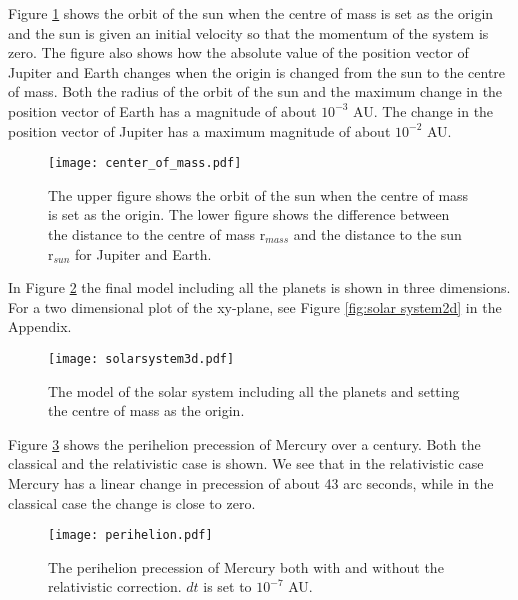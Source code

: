 Figure \ref{fig:centre of mass} shows the orbit of the sun when the centre of mass is set as the origin and the sun is given an initial velocity so that the momentum of the system is zero. The figure also shows how the absolute value of the position vector of Jupiter and Earth changes when the origin is changed from the sun to the centre of mass. Both the radius of the orbit of the sun and the maximum change in the position vector of Earth has a magnitude of about $10^{-3}$ AU. The change in the position vector of Jupiter has a maximum magnitude of about $10^{-2}$ AU.
\begin{figure}[htbp]
	\centering
	\texttt{[image: center\_of\_mass.pdf]}
	\caption{The upper figure shows the orbit of the sun when the centre of mass is set as the origin. The lower figure shows the difference between the distance to the centre of mass r$_{mass}$ and the distance to the sun r$_{sun}$ for Jupiter and Earth.}
	\label{fig:centre of mass}
\end{figure}

In Figure \ref{fig:solar system} the final model including all the planets is shown in three dimensions. For a two dimensional plot of the xy-plane, see Figure \ref{fig:solar system2d} in the Appendix.
\begin{figure}[htbp]
	\centering
	\texttt{[image: solarsystem3d.pdf]}
	\caption{The model of the solar system including all the planets and setting the centre of mass as the origin.}
	\label{fig:solar system}
\end{figure}

Figure \ref{fig:perihelion} shows the perihelion precession of Mercury over a century. Both the classical and the relativistic case is shown. We see that in the relativistic case Mercury has a linear change in precession of about 43 arc seconds, while in the classical case the change is close to zero.
\begin{figure}[htbp]
	\centering
	\texttt{[image: perihelion.pdf]}
	\caption{The perihelion precession of Mercury both with and without the relativistic correction. $dt$ is set to $10^{-7}$ AU.}
	\label{fig:perihelion}
\end{figure}
